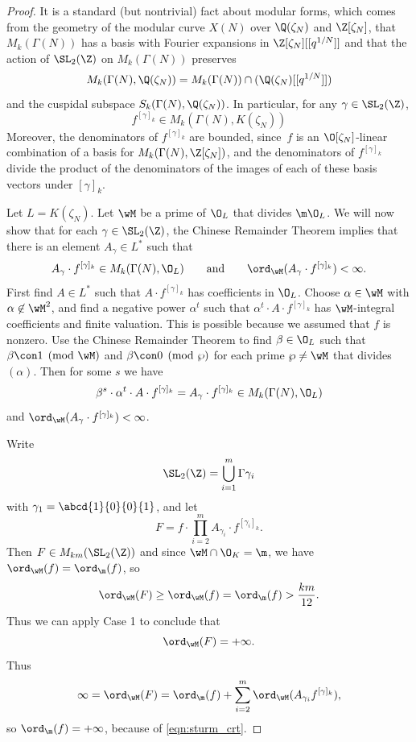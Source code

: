 \begin{proof}
It is a standard (but nontrivial) fact about modular forms, which
comes from the geometry of the modular curve $X(N)$ over $\Q(\zeta_N)$
and $\Z[\zeta_N]$, that $M_k(\Gamma(N))$ has a basis with Fourier
expansions in $\Z[\zeta_N][[q^{1/N}]]$ and that the action of
$\SL_2(\Z)$ on $M_k(\Gamma(N))$ preserves $$
M_k(\Gamma(N),\Q(\zeta_N)) = M_k(\Gamma(N)) \cap{}
(\Q(\zeta_N)[[q^{1/N}]])$$
and the cuspidal subspace
$S_k(\Gamma(N),\Q(\zeta_N))$.  In particular, for any
$\gamma\in\SL_2(\Z)$, $$
f^{[\gamma]_k} \in M_k(\Gamma(N), K(\zeta_N))
$$
Moreover, the denominators of $f^{[\gamma]_k}$ are bounded, since~$f$
is an $\O[\zeta_N]$-linear combination of a basis for
$M_k(\Gamma(N),\Z[\zeta_N])$, and the denominators of $f^{[\gamma]_k}$
divide the product of the denominators of the images of each of these
basis vectors under $[\gamma]_k$.
  
Let $L=K(\zeta_N)$.
Let $\wM$ be a prime of $\O_L$ that divides
$\m \O_L$.   We will now show that for each $\gamma\in\SL_2(\Z)$, the
Chinese Remainder Theorem implies that there is an element $A_\gamma\in L^*$
such that
\begin{equation}\label{eqn:sturm_crt}
A_\gamma \cdot f^{[\gamma]_k} \in M_k(\Gamma(N), \O_L)
\qquad \text{and}
\qquad \ord_{\wM} (A_{\gamma} \cdot f^{[\gamma]_k}) < \infty.
\end{equation}
First find $A \in L^*$ such that 
$A\cdot f^{[\gamma]_k}$ has coefficients in $\O_L$.
Choose $\alpha\in \wM$ with $\alpha \not\in \wM^2$, and find a negative power
$\alpha^t$ such that $\alpha^t\cdot A\cdot f^{[\gamma]_k}$
has $\wM$-integral coefficients and finite valuation.  
This is possible because we assumed that $f$ is nonzero.
Use the Chinese Remainder Theorem to find $\beta\in \O_L$
such that $\beta\con 1\pmod{\wM}$ and $\beta\con 0\pmod{\wp}$
for each prime $\wp\neq \wM$ that divides $(\alpha)$.
Then for some $s$ we have 
$$
 \beta^s \cdot \alpha^t \cdot A\cdot f^{[\gamma]_k}  
   = A_\gamma \cdot f^{[\gamma]_k}
   \in M_k(\Gamma(N),\O_L)
$$
and $\ord_{\wM}(A_\gamma \cdot f^{[\gamma]_k}) < \infty$.



Write 
$$
 \SL_2(\Z) = \bigcup_{i=1}^m \Gamma{} \gamma_i
$$
with $\gamma_1 = \abcd{1}{0}{0}{1}$, and let
$$
  F = f \cdot \prod_{i=2}^m A_{\gamma_i} \cdot f^{[\gamma_i]_k}.
$$
Then 
$
  F \in M_{km}(\SL_2(\Z))
$
and since $\wM\cap \O_K = \m$, we have $\ord_{\wM}(f) = \ord_{\m}(f)$,
so
$$
 \ord_{\wM}(F) \geq \ord_{\wM}(f) = \ord_{\m}(f) > \frac{km}{12}.
$$
Thus we can apply Case 1 to conclude that
$$
 \ord_{\wM}(F) = +\infty.
$$
Thus
\begin{equation}\label{eqn:sturm:ords}
  \infty = \ord_{\wM}(F) = \ord_\m(f) + \sum_{i=2}^m \ord_{\wM}(A_{\gamma_i} 
  f^{[\gamma]_k}),
\end{equation}
so $\ord_\m(f)=+\infty$, because of \eqref{eqn:sturm_crt}.
    

\end{proof}

